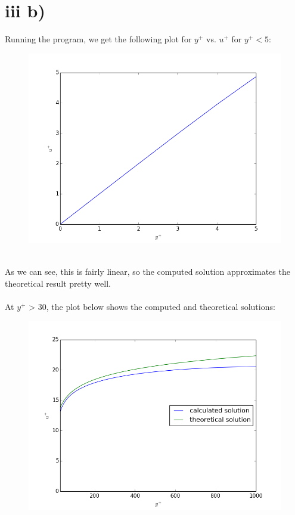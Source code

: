 \documentclass[a4paper,english,11pt,twoside]{article}
\begin{document}
\newpage
\section*{iii b)}
Running the program, we get the following plot for $y^+$ vs. $u^+$ for $y^+ < 5$:
\begin{figure}[h!]
\includegraphics[scale=0.7]{3b_figure_1.png}
\end{figure}
\\
As we can see, this is fairly linear, so the computed solution approximates the theoretical result pretty well.\\
\\
\newpage
At $y^+$ > 30, the plot below shows the computed and theoretical solutions:
\begin{figure}[h!]
\includegraphics[scale=0.6]{3b_figure_2.png}
\end{figure}\\
\end{document}
